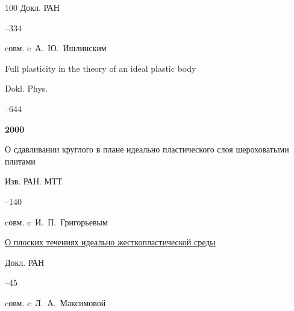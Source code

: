 \begin{thebibliography}{100}
\jour Докл. РАН




--334

\miscnote cовм. c~А.~Ю.~Ишлинским



\transl


\paper Full plasticity in the theory of an ideal plastic body

\jour Dokl. Phys.




--644









\item[] \centerline{\bf 2000}




\paper  О сдавливании круглого в плане идеально пластического слоя шероховатыми плитами 

\jour Изв. РАН. МТТ



–140 

\miscnote cовм. c~И.~П.~Григорьевым






\paper \href{http://mi.mathnet.ru/dan18376}{О плоских течениях идеально жесткопластической среды}

\jour Докл. РАН




--45


\miscnote cовм. c~Л.~А.~Максимовой

\transl



\end{thebibliography}
